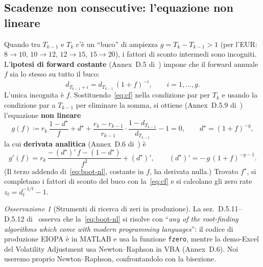 \documentclass[11pt,a4paper]{article}
\theoremstyle{plain}
\theoremstyle{definition}
\theoremstyle{remark}
\newtheorem*{osservazione}{Osservazione}
\newcommand{\defeq}{\coloneqq}
\begin{document}
\subsection{Scadenze non consecutive: l'equazione non lineare}
\label{sec:nonlin}

Quando tra $T_{k-1}$ e $T_k$ c'\`e un ``buco'' di ampiezza $g=T_k-T_{k-1}>1$ (per l'EUR:
$8\!\to\!10$, $10\!\to\!12$, $12\!\to\!15$, $15\!\to\!20$), i fattori di sconto intermedi sono
incogniti. L'\textbf{ipotesi di forward costante} (Annex~D.5 di~\cite{eiopa2026}) impone che
il forward annuale $f$ sia lo stesso su tutto il buco:
\begin{equation}
  \label{eq:cf}
  d_{T_{k-1}+i} = d_{T_{k-1}}\,(1+f)^{-i}, \qquad i=1,\ldots,g.
\end{equation}
L'unica incognita \`e $f$. Sostituendo~\eqref{eq:cf} nella condizione par per $T_k$ e usando
la condizione par a $T_{k-1}$ per eliminare la somma, si ottiene (Annex~D.5.9
di~\cite{eiopa2026}) l'equazione \textbf{non lineare}
\begin{equation}
  \label{eq:boot-nl}
  g(f) \defeq r_{k}\,\frac{1 - d^\star}{f}
            + d^\star
            + \frac{r_{k} - r_{k-1}}{r_{k-1}}\cdot\frac{1 - d_{T_{k-1}}}{d_{T_{k-1}}}
            - 1 = 0,
  \qquad d^\star = (1+f)^{-g},
\end{equation}
la cui \textbf{derivata analitica} (Annex~D.6 di~\cite{eiopa2026}) \`e
\begin{equation}
  \label{eq:boot-nl-der}
  g'(f) = r_{k}\,\frac{-\,(d^\star)'\,f - (1 - d^\star)}{f^2} + (d^\star)',
  \qquad (d^\star)' = -\,g\,(1+f)^{-g-1}.
\end{equation}
(Il terzo addendo di~\eqref{eq:boot-nl}, costante in $f$, ha derivata nulla.) Trovato
$f^\star$, si completano i fattori di sconto del buco con la~\eqref{eq:cf} e si calcolano gli
zero rate $z_t=d_t^{-1/t}-1$.

\begin{osservazione}[Strumenti di ricerca di zeri in produzione]
La sez.~D.5.11--D.5.12 di~\cite{eiopa2026} osserva che la~\eqref{eq:boot-nl} si risolve con
``\emph{any of the root-finding algorithms which come with modern programming languages}'': il
codice di produzione EIOPA \`e in MATLAB e usa la funzione \texttt{fzero}, mentre la
demo-Excel del Volatility Adjustment usa Newton--Raphson in VBA (Annex~D.6). Noi useremo
proprio Newton--Raphson, confrontandolo con la bisezione.
\end{osservazione}
\end{document}
